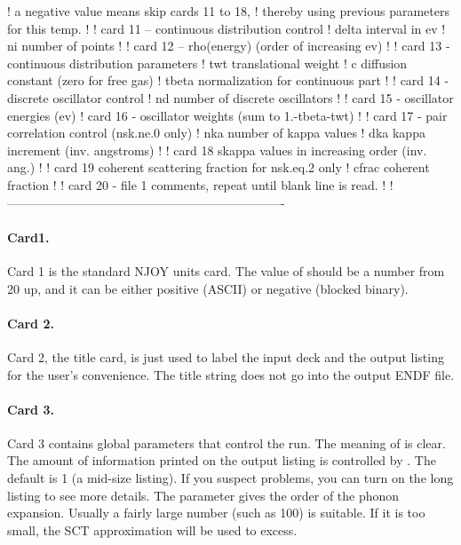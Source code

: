 \begin{ccode}
   !       a negative value means skip cards 11 to 18,
   !          thereby using previous parameters for this temp.
   !
   !    card 11 -- continuous distribution control
   !       delta    interval in ev
   !       ni       number of points
   !
   !    card 12 -- rho(energy) (order of increasing ev)
   !
   !    card 13 - continuous distribution parameters
   !       twt       translational weight
   !       c         diffusion constant (zero for free gas)
   !       tbeta     normalization for continuous part
   !
   !    card 14 - discrete oscillator control
   !       nd     number of discrete oscillators
   !
   !    card 15 - oscillator energies (ev)
   !    card 16 - oscillator weights (sum to 1.-tbeta-twt)
   !
   !    card 17 - pair correlation control (nsk.ne.0 only)
   !       nka     number of kappa values
   !       dka     kappa increment (inv. angstroms)
   !
   !    card 18  skappa values in increasing order (inv. ang.)
   !
   !    card 19  coherent scattering fraction for nsk.eq.2 only
   !       cfrac   coherent fraction
   !
   ! card 20 - file 1 comments, repeat until blank line is read.
   !
   !-------------------------------------------------------------------

\end{ccode}
\normalsize

\paragraph{Card1.}
Card 1 is the standard NJOY units card.  The value of  should
be a number from 20 up, and it can be either positive (ASCII) or negative
(blocked binary).

\paragraph{Card 2.}
Card 2, the title card, is just used to label the input deck and the output
listing for the user's convenience.  The title string does not go into
the output ENDF file.

\paragraph{Card 3.}
Card 3 contains global parameters that control the run.  The meaning
of  is clear. The amount of information printed on the
output listing is controlled by .  The default is 1
(a mid-size listing).  If you suspect problems, you can turn on the
long listing to see more details.  The parameter  gives
the order of the phonon expansion.  Usually a fairly large number
(such as 100) is suitable.  If it is too small, the SCT approximation
will be used to excess.

